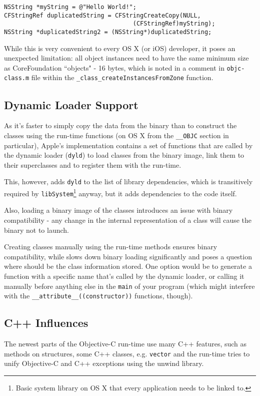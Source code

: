 \begin{verbatim}
NSString *myString = @"Hello World!";
CFStringRef duplicatedString = CFStringCreateCopy(NULL, 
                                    (CFStringRef)myString);
NSString *duplicatedString2 = (NSString*)duplicatedString;
\end{verbatim}

While this is very convenient to every OS X (or iOS) developer, it poses an unexpected limitation: all object instances need to have the same minimum size as CoreFoundation ``objects" - 16 bytes, which is noted in a comment in \verb=objc-class.m= file within the \verb=_class_createInstancesFromZone= function.

\subsection{Dynamic Loader Support}
As it's faster to simply copy the data from the binary than to construct the classes using the run-time functions (on OS X from the \verb=__OBJC= section in particular), Apple's implementation contains a set of functions that are called by the dynamic loader (\verb=dyld=) to load classes from the binary image, link them to their superclasses and to register them with the run-time.

This, however, adds \verb=dyld= to the list of library dependencies, which is transitively required by \verb=libSystem=\footnote{Basic system library on OS X that every application needs to be linked to.} anyway, but it adds dependencies to the code itself.

Also, loading a binary image of the classes introduces an issue with binary compatibility - any change in the internal representation of a class will cause the binary not to launch.

Creating classes manually using the run-time methods ensures binary compatibility, while slows down binary loading significantly and poses a question where should be the class information stored. One option would be to generate a function with a specific name that's called by the dynamic loader, or calling it manually before anything else in the \verb=main= of your program (which might interfere with the \verb=__attribute__((constructor))= functions, though).

\subsection{C++ Influences}
The newest parts of the Objective-C run-time use many C++ features, such as methods on structures, some C++ classes, e.g. \verb=vector= and the run-time tries to unify Objective-C and C++ exceptions using the unwind library.

